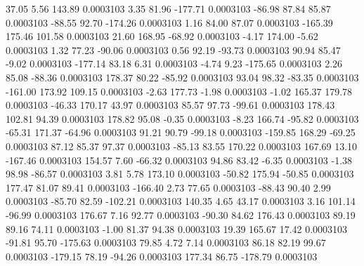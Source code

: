        37.05        5.56      143.89     0.0003103
        3.35       81.96     -177.71     0.0003103
      -86.98       87.84       85.87     0.0003103
      -88.55       92.70     -174.26     0.0003103
        1.16       84.00       87.07     0.0003103
     -165.39      175.46      101.58     0.0003103
       21.60      168.95      -68.92     0.0003103
       -4.17      174.00       -5.62     0.0003103
        1.32       77.23      -90.06     0.0003103
        0.56       92.19      -93.73     0.0003103
       90.94       85.47       -9.02     0.0003103
     -177.14       83.18        6.31     0.0003103
       -4.74        9.23     -175.65     0.0003103
        2.26       85.08      -88.36     0.0003103
      178.37       80.22      -85.92     0.0003103
       93.04       98.32      -83.35     0.0003103
     -161.00      173.92      109.15     0.0003103
       -2.63      177.73       -1.98     0.0003103
       -1.02      165.37      179.78     0.0003103
      -46.33      170.17       43.97     0.0003103
       85.57       97.73      -99.61     0.0003103
      178.43      102.81       94.39     0.0003103
      178.82       95.08       -0.35     0.0003103
       -8.23      166.74      -95.82     0.0003103
      -65.31      171.37      -64.96     0.0003103
       91.21       90.79      -99.18     0.0003103
     -159.85      168.29      -69.25     0.0003103
       87.12       85.37       97.37     0.0003103
      -85.13       83.55      170.22     0.0003103
      167.69       13.10     -167.46     0.0003103
      154.57        7.60      -66.32     0.0003103
       94.86       83.42       -6.35     0.0003103
       -1.38       98.98      -86.57     0.0003103
        3.81        5.78      173.10     0.0003103
      -50.82      175.94      -50.85     0.0003103
      177.47       81.07       89.41     0.0003103
     -166.40        2.73       77.65     0.0003103
      -88.43       90.40        2.99     0.0003103
      -85.70       82.59     -102.21     0.0003103
      140.35        4.65       43.17     0.0003103
        3.16      101.14      -96.99     0.0003103
      176.67        7.16       92.77     0.0003103
      -90.30       84.62      176.43     0.0003103
       89.19       89.16       74.11     0.0003103
       -1.00       81.37       94.38     0.0003103
       19.39      165.67       17.42     0.0003103
      -91.81       95.70     -175.63     0.0003103
       79.85        4.72        7.14     0.0003103
       86.18       82.19       99.67     0.0003103
     -179.15       78.19      -94.26     0.0003103
      177.34       86.75     -178.79     0.0003103
